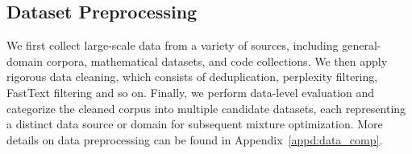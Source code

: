 \documentclass{article}
\theoremstyle{plain}
\theoremstyle{definition}
\theoremstyle{remark}
\newcommand{\comments}[1]{\textcolor{red}{#1}}
\newcommand{\lsr}[1]{\textcolor{green!50!black}{#1}}
\begin{document}

\subsection{Dataset Preprocessing}
\label{2.1}
We first collect large-scale data from a variety of sources, including general-domain corpora, mathematical datasets, and code collections. We then apply rigorous data cleaning, which consists of deduplication, perplexity filtering, FastText filtering and so on. Finally, we perform data-level evaluation and categorize the cleaned corpus into multiple candidate datasets, each representing a distinct data source or domain for subsequent mixture optimization. More details on data preprocessing can be found in Appendix~\ref{appd:data_comp}.




\end{document}
